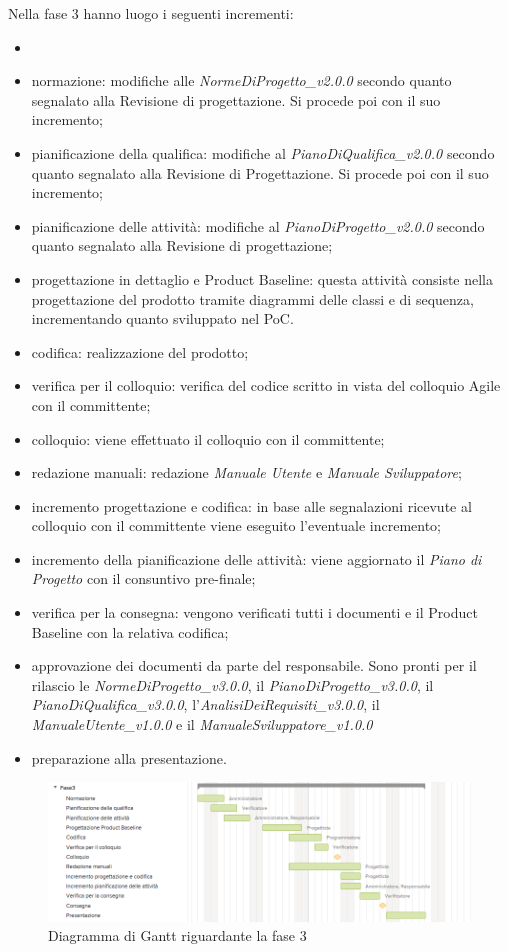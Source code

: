 Nella fase 3 hanno luogo i seguenti incrementi:
\begin{itemize}
	\item 
	
	
	
	\item normazione: modifiche alle \textit{NormeDiProgetto\_v2.0.0} secondo quanto segnalato alla Revisione di progettazione. Si procede poi con il suo incremento;
	\item pianificazione della qualifica: modifiche al \textit{PianoDiQualifica\_v2.0.0} secondo quanto segnalato alla Revisione di Progettazione. Si procede poi con il suo incremento;
	\item pianificazione delle attività: modifiche al \textit{PianoDiProgetto\_v2.0.0} secondo quanto segnalato alla Revisione di progettazione;
	\item progettazione in dettaglio e Product Baseline: questa attività consiste nella progettazione del prodotto tramite diagrammi delle classi e di sequenza, incrementando quanto sviluppato nel PoC.
	\item codifica: realizzazione del prodotto;
	\item verifica per il colloquio: verifica del codice scritto in vista del colloquio Agile con il committente;
	\item colloquio: viene effettuato il colloquio con il committente;
	\item redazione manuali: redazione \textit{Manuale Utente} e \textit{Manuale Sviluppatore};
	\item incremento progettazione e codifica: in base alle segnalazioni ricevute al colloquio con il committente viene eseguito l'eventuale incremento;
	\item incremento della pianificazione delle attività: viene aggiornato il \textit{Piano di Progetto} con il consuntivo pre-finale;
	\item verifica per la consegna: vengono verificati tutti i documenti e il Product Baseline con la relativa codifica;
	\item approvazione dei documenti da parte del responsabile. Sono pronti per il rilascio le \textit{NormeDiProgetto\_v3.0.0}, il \textit{PianoDiProgetto\_v3.0.0}, il \textit{PianoDiQualifica\_v3.0.0}, l'\textit{AnalisiDeiRequisiti\_v3.0.0}, il
	\textit{ManualeUtente\_v1.0.0} e il \textit{ManualeSviluppatore\_v1.0.0}
	\item preparazione alla presentazione.
\end{itemize}

\begin{figure}[h]
	\centering
	\includegraphics[scale=0.70]{images/fase3.png}
	\caption{Diagramma di Gantt riguardante la fase 3}
\end{figure}